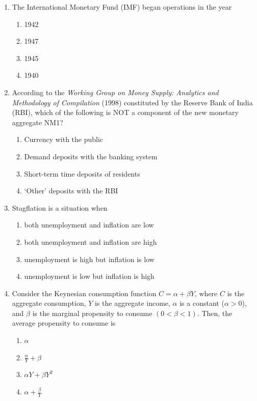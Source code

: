 \documentclass[journal,13pt,onecolumn]{exam}
\theoremstyle{remark}
\begin{document}
\begin{enumerate}[label=Q.\arabic*]
    \item The International Monetary Fund (IMF) began operations in the year
    \begin{enumerate}
        \item 1942
        \item 1947
        \item 1945
        \item 1940
    \end{enumerate}

\item According to the \textit{Working Group on Money Supply: Analytics and Methodology of Compilation} (1998) constituted by the Reserve Bank of India (RBI), which of the following is NOT a component of the new monetary aggregate NM1?
    
    \begin{enumerate}
        \item Currency with the public
        \item Demand deposits with the banking system
        \item Short-term time deposits of residents
        \item `Other' deposits with the RBI
    \end{enumerate}
    
 \item Stagflation is a situation when
    
    \begin{enumerate}
        \item both unemployment and inflation are low
        \item both unemployment and inflation are high
        \item unemployment is high but inflation is low
        \item unemployment is low but inflation is high
    \end{enumerate}

 \item Consider the Keynesian consumption function \( C = \alpha + \beta Y \), where \( C \) is the aggregate consumption, \( Y \) is the aggregate income, \( \alpha \) is a constant (\(\alpha > 0\)), and \(\beta\) is the marginal propensity to consume \((0 < \beta < 1)\). Then, the average propensity to consume is
    \begin{enumerate}[label=\textbf{(\Alph*)}]
        \item \( \alpha \)
        \item \( \frac{\alpha}{Y} + \beta \)
        \item \( \alpha Y + \beta Y^2 \)
        \item \( \alpha + \frac{\beta}{Y} \)
    \end{enumerate}


\end{enumerate}
\end{document}
